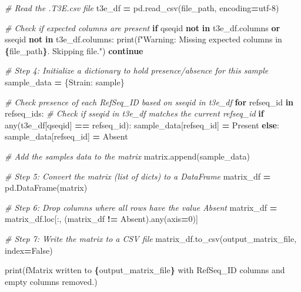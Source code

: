 \documentclass[
]{book}
\newenvironment{Shaded}{\begin{snugshade}}{\end{snugshade}}
\newcommand{\BuiltInTok}[1]{#1}
\newcommand{\CommentTok}[1]{\textcolor[rgb]{0.56,0.35,0.01}{\textit{#1}}}
\newcommand{\ControlFlowTok}[1]{\textcolor[rgb]{0.13,0.29,0.53}{\textbf{#1}}}
\newcommand{\DecValTok}[1]{\textcolor[rgb]{0.00,0.00,0.81}{#1}}
\newcommand{\KeywordTok}[1]{\textcolor[rgb]{0.13,0.29,0.53}{\textbf{#1}}}
\newcommand{\NormalTok}[1]{#1}
\newcommand{\OperatorTok}[1]{\textcolor[rgb]{0.81,0.36,0.00}{\textbf{#1}}}
\newcommand{\SpecialCharTok}[1]{\textcolor[rgb]{0.81,0.36,0.00}{\textbf{#1}}}
\newcommand{\SpecialStringTok}[1]{\textcolor[rgb]{0.31,0.60,0.02}{#1}}
\newcommand{\StringTok}[1]{\textcolor[rgb]{0.31,0.60,0.02}{#1}}
\newcommand{\VariableTok}[1]{\textcolor[rgb]{0.00,0.00,0.00}{#1}}
\begin{document}
\begin{Shaded}
\begin{Highlighting}[]
        \CommentTok{\# Read the .T3E.csv file}
\NormalTok{        t3e\_df }\OperatorTok{=}\NormalTok{ pd.read\_csv(file\_path, encoding}\OperatorTok{=}\StringTok{\textquotesingle{}utf{-}8\textquotesingle{}}\NormalTok{)}
        
        \CommentTok{\# Check if expected columns are present}
        \ControlFlowTok{if} \StringTok{\textquotesingle{}qseqid\textquotesingle{}} \KeywordTok{not} \KeywordTok{in}\NormalTok{ t3e\_df.columns }\KeywordTok{or} \StringTok{\textquotesingle{}sseqid\textquotesingle{}} \KeywordTok{not} \KeywordTok{in}\NormalTok{ t3e\_df.columns:}
            \BuiltInTok{print}\NormalTok{(}\SpecialStringTok{f"Warning: Missing expected columns in }\SpecialCharTok{\{}\NormalTok{file\_path}\SpecialCharTok{\}}\SpecialStringTok{. Skipping file."}\NormalTok{)}
            \ControlFlowTok{continue}
        
        \CommentTok{\# Step 4: Initialize a dictionary to hold presence/absence for this sample}
\NormalTok{        sample\_data }\OperatorTok{=}\NormalTok{ \{}\StringTok{\textquotesingle{}Strain\textquotesingle{}}\NormalTok{: sample\}}
        
        \CommentTok{\# Check presence of each RefSeq\_ID based on sseqid in t3e\_df}
        \ControlFlowTok{for}\NormalTok{ refseq\_id }\KeywordTok{in}\NormalTok{ refseq\_ids:}
            \CommentTok{\# Check if sseqid in t3e\_df matches the current refseq\_id}
            \ControlFlowTok{if} \BuiltInTok{any}\NormalTok{(t3e\_df[}\StringTok{\textquotesingle{}qseqid\textquotesingle{}}\NormalTok{] }\OperatorTok{==}\NormalTok{ refseq\_id):}
\NormalTok{                sample\_data[refseq\_id] }\OperatorTok{=} \StringTok{\textquotesingle{}Present\textquotesingle{}}
            \ControlFlowTok{else}\NormalTok{:}
\NormalTok{                sample\_data[refseq\_id] }\OperatorTok{=} \StringTok{\textquotesingle{}Absent\textquotesingle{}}
        
        \CommentTok{\# Add the sample\textquotesingle{}s data to the matrix}
\NormalTok{        matrix.append(sample\_data)}

\CommentTok{\# Step 5: Convert the matrix (list of dicts) to a DataFrame}
\NormalTok{matrix\_df }\OperatorTok{=}\NormalTok{ pd.DataFrame(matrix)}

\CommentTok{\# Step 6: Drop columns where all rows have the value \textquotesingle{}Absent\textquotesingle{}}
\NormalTok{matrix\_df }\OperatorTok{=}\NormalTok{ matrix\_df.loc[:, (matrix\_df }\OperatorTok{!=} \StringTok{\textquotesingle{}Absent\textquotesingle{}}\NormalTok{).}\BuiltInTok{any}\NormalTok{(axis}\OperatorTok{=}\DecValTok{0}\NormalTok{)]}

\CommentTok{\# Step 7: Write the matrix to a CSV file}
\NormalTok{matrix\_df.to\_csv(output\_matrix\_file, index}\OperatorTok{=}\VariableTok{False}\NormalTok{)}

\BuiltInTok{print}\NormalTok{(}\SpecialStringTok{f\textquotesingle{}Matrix written to }\SpecialCharTok{\{}\NormalTok{output\_matrix\_file}\SpecialCharTok{\}}\SpecialStringTok{ with RefSeq\_ID columns and empty columns removed.\textquotesingle{}}\NormalTok{)}
\end{Highlighting}
\end{Shaded}
\end{document}
